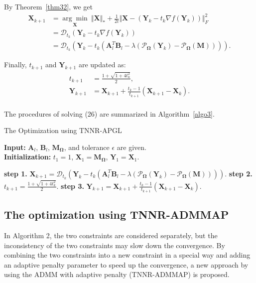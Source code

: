 \documentclass{article}
\begin{document}
{By Theorem~\ref{thm32}, we get
\begin{equation}
    \begin{aligned}
        \mathbf X_{k+1} & = \underset{\mathbf X}{\arg\min}\  \Vert\mathbf X \Vert_* + \frac{1}{2t}\Vert\mathbf X- (\mathbf Y_k -t_k \nabla f(\mathbf Y_k))\Vert_F^2 \\
        & = \mathcal{D}_{t_k}(\mathbf Y_k - t_k\nabla f(\mathbf Y_k)) \\
        & = \mathcal{D}_{t_k}(\mathbf Y_k - t_k(\mathbf A_l^T\mathbf B_l - \lambda(\mathcal{P}_{\mathbf\Omega}(\mathbf Y_k)- \mathcal{P}_{\mathbf\Omega}(\mathbf M)))).
    \end{aligned}
\end{equation}

Finally, $t_{k+1}$ and $\mathbf Y_{k+1}$ are updated as:
\begin{equation}
    \begin{aligned}
        t_{k+1} & = \frac{1+\sqrt{1+4t^2_k}}{2}, \\
        \mathbf Y_{k+1}& = \mathbf X_{k+1} +\frac{t_{k}-1}{t_{k+1}}(\mathbf X_{k+1}-\mathbf X_{k}). \\
    \end{aligned}
\end{equation}

The procedures of solving (26) are summarized in Algorithm~\ref{algo3}.

\begin{algorithm}[t]
    \caption{The Optimization using TNNR-APGL}
    \label{algo3}
    \textbf{Input:} $\mathbf A_l$, $\mathbf B_l$, $\mathbf M_{\mathbf\Omega}$, and tolerance $\epsilon$ are given.\\
    \textbf{Initialization:} $t_1 = 1$, $\mathbf X_1 = \mathbf M_{\mathbf\Omega}$, $\mathbf Y_1=\mathbf X_1$.
    \begin{algorithmic}
        \Repeat 
        \State \textbf{step 1.} $\mathbf X_{k+1} = \mathcal{D}_{t_k}(\mathbf Y_k - t_k(\mathbf A_l^T\mathbf B_l - \lambda(\mathcal{P}_{\mathbf\Omega}(\mathbf Y_k)- \mathcal{P}_{\mathbf\Omega}(\mathbf M))))$.
        \State \textbf{step 2.} $t_{k+1} = \frac{1+\sqrt{1+4t^2_k}}{2}$.
        \State \textbf{step 3.} $\mathbf Y_{k+1} = \mathbf X_{k+1} +\frac{t_{k}-1}{t_{k+1}}(\mathbf X_{k+1}-\mathbf X_{k})$.
    \end{algorithmic}
\end{algorithm}


\subsection{The optimization using TNNR-ADMMAP}
In Algorithm 2, the two constraints are considered separately, but the inconsistency of the two constraints may slow down the convergence.
By combining the two constraints into a new constraint in a special way\cite{he2012alternating} and adding an adaptive penalty parameter\cite{lin2011linearized} to speed up the convergence,  a new approach by using the ADMM with adaptive penalty (TNNR-ADMMAP) is proposed.
}
\end{document}
